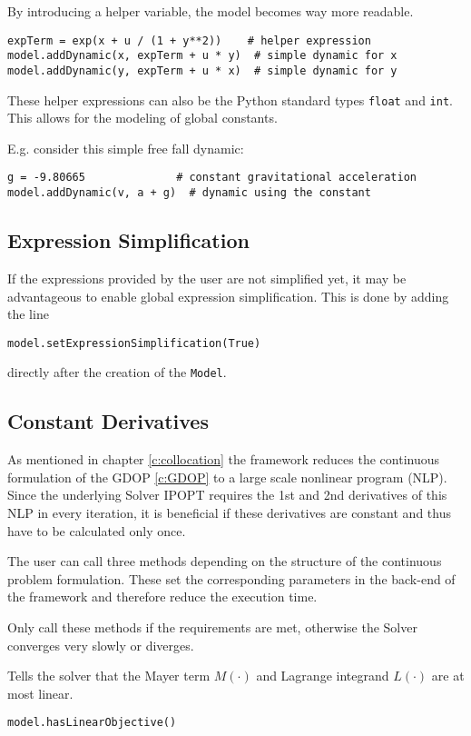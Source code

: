 \documentclass[12pt]{article}
\begin{document}
By introducing a helper variable, the model becomes way more readable.

\begin{lstlisting}
expTerm = exp(x + u / (1 + y**2))	 # helper expression
model.addDynamic(x, expTerm + u * y)  # simple dynamic for x
model.addDynamic(y, expTerm + u * x)  # simple dynamic for y
	\end{lstlisting}

These helper expressions can also be the Python standard types
\texttt{float} and \texttt{int}. This allows for the modeling of global
constants.

E.g. consider this simple free fall dynamic:
\begin{lstlisting}
g = -9.80665		      # constant gravitational acceleration  
model.addDynamic(v, a + g)  # dynamic using the constant
	\end{lstlisting}

\subsection{Expression Simplification}
If the expressions provided by the user are not simplified yet, it
may be advantageous to enable global expression simplification. This is done by
adding the line
\begin{lstlisting}
model.setExpressionSimplification(True)
	\end{lstlisting}
directly after the creation of the \texttt{Model}.

\subsection{Constant Derivatives}
As mentioned in chapter \eqref{c:collocation} the framework reduces the
continuous formulation of the GDOP \eqref{c:GDOP} to a large scale nonlinear
program (NLP). Since the underlying Solver IPOPT requires the 1st and 2nd
derivatives of this NLP in every iteration, it is beneficial if these
derivatives are constant and thus have to be calculated only once.

The user can call three methods depending on the structure of the
continuous problem formulation. These set the corresponding parameters in
the back-end of the framework and therefore reduce the execution time.

Only call these methods if the requirements are met, otherwise the
Solver converges very slowly or diverges.

\begin{mdframed}[backgroundcolor=gray!10, roundcorner=10pt,
		linewidth=1pt]

	Tells the solver that the Mayer term $M(\cdot)$ and Lagrange integrand $L(\cdot)$ are at
	most linear.

	\begin{lstlisting}
model.hasLinearObjective()
		\end{lstlisting}
	\label{hasLinearObjective}
\end{mdframed}
\end{document}
